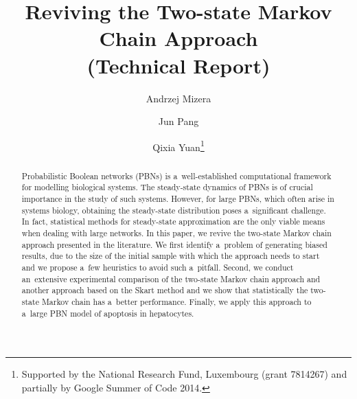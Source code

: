 \documentclass[runningheads,a4paper]{llncs}
\begin{document}
\mainmatter



\title{Reviving the Two-state Markov Chain Approach \\ (Technical Report)}





\author{Andrzej Mizera \and Jun Pang \and Qixia Yuan\thanks{Supported
by the National Research Fund, Luxembourg (grant 7814267) and partially by Google Summer of Code 2014. }}

\maketitle

\begin{abstract}
Probabilistic Boolean networks (PBNs) is a~well-established computational framework for
modelling biological systems. The steady-state dynamics of PBNs is of crucial importance in
the study of such systems. However, for large PBNs, which often arise in systems biology,
obtaining the steady-state distribution poses a~significant challenge. In fact, statistical
methods for steady-state approximation are the only viable means when dealing with large
networks. In this paper, we revive the two-state Markov chain approach presented in the
literature. We first identify a~problem of generating biased results, due to the size of the
initial sample with which the approach needs to start and we propose a~few heuristics to avoid
such a~pitfall. Second, we conduct an~extensive experimental comparison of the two-state Markov chain
approach and another approach based on the Skart method and we show that statistically the
two-state Markov chain has a~better performance. Finally, we apply this approach to a~large PBN
model of apoptosis in hepatocytes.

\end{abstract}
\end{document}
